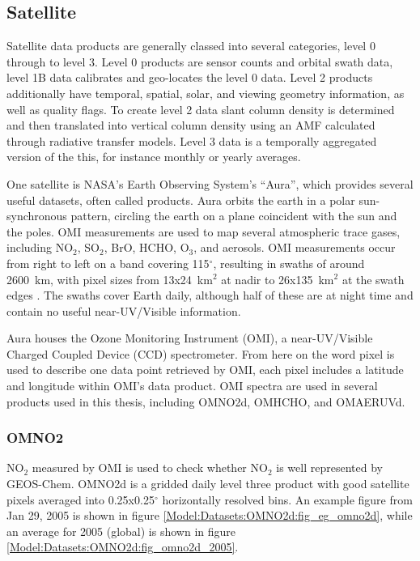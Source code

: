   \subsection{Satellite}
    \label{Model:Datasets:Aura}
    
    Satellite data products are generally classed into several categories, level 0 through to level 3. Level 0 products are sensor counts and orbital swath data, level 1B data calibrates and geo-locates the level 0 data. 
    Level 2 products additionally have temporal, spatial, solar, and viewing geometry information, as well as quality flags.
    To create level 2 data slant column density is determined and then translated into vertical column density using an AMF calculated through radiative transfer models. 
    Level 3 data is a temporally aggregated version of the this, for instance monthly or yearly averages.
    
    One satellite is NASA's Earth Observing System's ``Aura'', which provides several useful datasets, often called products.
    Aura orbits the earth in a polar sun-synchronous pattern, circling the earth on a plane coincident with the sun and the poles.
    OMI measurements are used to map several atmospheric trace gases, including NO$_2$, SO$_2$, BrO, HCHO, O$_3$, and aerosols.
    OMI measurements occur from right to left on a band covering 115$^{\circ}$, resulting in swaths of around 2600~km, with pixel sizes from 13x24~km$^2$ at nadir to 26x135~km$^2$ at the swath edges \parencite{Abad2015}.
    The swaths cover Earth daily, although half of these are at night time and contain no useful near-UV/Visible information.
    
    Aura houses the Ozone Monitoring Instrument (OMI), a near-UV/Visible Charged Coupled Device (CCD) spectrometer.
    From here on the word pixel is used to describe one data point retrieved by OMI, each pixel includes a latitude and longitude within OMI's data product.
    OMI spectra are used in several products used in this thesis, including OMNO2d, OMHCHO, and OMAERUVd.
    
    
    \subsubsection{OMNO2}
      \label{Model:Datasets:OMNO2d}
      NO$_2$ measured by OMI is used to check whether NO$_2$ is well represented by GEOS-Chem. 
      OMNO2d is a gridded daily level three product with good satellite pixels averaged into 0.25x0.25$^{\circ}$ horizontally resolved bins.
      An example figure from Jan 29, 2005 is shown in figure \ref{Model:Datasets:OMNO2d:fig_eg_omno2d}, while an average for 2005 (global) is shown in figure \ref{Model:Datasets:OMNO2d:fig_omno2d_2005}.
      
